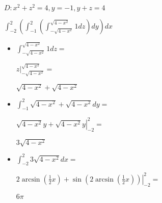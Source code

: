 \documentclass[../practica_08.tex]{subfiles}
\begin{document}
    $ D: x^2+z^2=4, y = -1, y + z = 4 $

    $ \int_{-2}^2 (\int_{-1}^2 (\int_{-\sqrt{4-x^2}}^{\sqrt{4-x^2}} 1 dz ) dy) dx$

    \begin{itemize}

        \item $\int_{-\sqrt{4-x^2}}^{\sqrt{4-x^2}} 1 dz = $

            $ \left. z \right |_{-\sqrt{4-x^2}}^{\sqrt{4-x^2}} =  $

            $ \sqrt{4-x^2} + \sqrt{4-x^2} $

        \item $ \int_{-1}^2 \sqrt{4-x^2} + \sqrt{4-x^2} dy =  $
        
            $ \left. \sqrt{4-x^2}y + \sqrt{4-x^2}y \right |_{-2}^2 = $

            $ 3\sqrt{4-x^2} $

        \item $\int_{-2}^2 3\sqrt{4-x^2} dx = $
        
            $ \left. 2\arcsin \left(\frac{1}{2}x\right)+\sin \left(2\arcsin \left(\frac{1}{2}x\right)\right) \right |_{-2}^2 = $

            $ 6\pi$

    \end{itemize}

    
\end{document}
